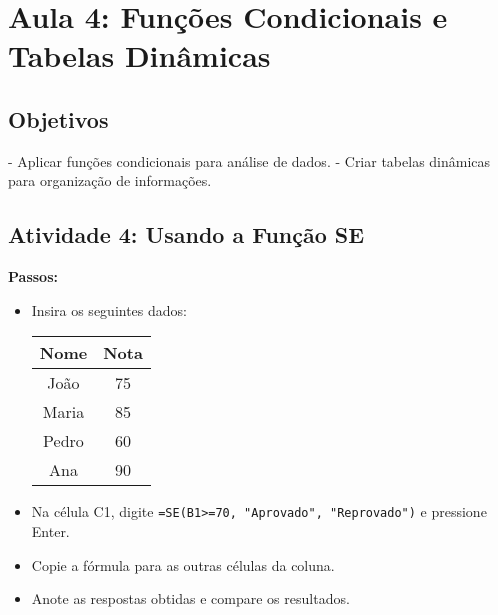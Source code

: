\documentclass[12pt]{article}
\begin{document}
\section*{Aula 4: Funções Condicionais e Tabelas Dinâmicas}
\subsection*{Objetivos}
- Aplicar funções condicionais para análise de dados.
- Criar tabelas dinâmicas para organização de informações.

\subsection*{Atividade 4: Usando a Função SE}
\textbf{Passos:}
\begin{itemize}
    \item Insira os seguintes dados:
    \begin{center}
        \begin{tabular}{|c|c|}
        \hline
        Nome & Nota \\
        \hline
        João & 75 \\
        Maria & 85 \\
        Pedro & 60 \\
        Ana & 90 \\
        \hline
        \end{tabular}
    \end{center}
    \item Na célula C1, digite \texttt{=SE(B1>=70, "Aprovado", "Reprovado")} e pressione Enter.
    \item Copie a fórmula para as outras células da coluna.
    \item Anote as respostas obtidas e compare os resultados.
\end{itemize}
\end{document}
